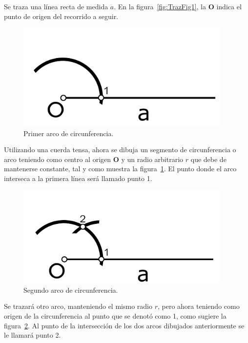 Se traza una línea recta de medida $a$. En la figura~\ref{fig:TrazFig1}, la \textbf{O} indica el punto de origen del recorrido a seguir.\\

\begin{figure}[H]
\centering
\includegraphics[width=0.95\textwidth]{Figures/Cuad2}
\caption[Primer arco de circunferencia.]{Primer arco de circunferencia.}
\label{fig:TrazFig2}
\end{figure}

Utilizando una cuerda tensa, ahora se dibuja un segmento de circunferencia o arco teniendo como centro al origen \textbf{O} y un radio arbitrario $r$ que debe de mantenerse constante, tal y como muestra la figura~\ref{fig:TrazFig2}. El punto donde el arco interseca a la primera línea será llamado punto 1. 

\begin{figure}[H]
\centering
\includegraphics[width=0.95\textwidth]{Figures/Cuad3}
\caption[Segundo arco de circunferencia.]{Segundo arco de circunferencia.}
\label{fig:TrazFig3}
\end{figure}

Se trazará otro arco, manteniendo el mismo radio $r$, pero ahora teniendo como origen de la circunferencia al punto que se denotó como 1, como sugiere la figura~\ref{fig:TrazFig3}. Al punto de la intersección de los dos arcos dibujados anteriormente se le llamará punto 2.

